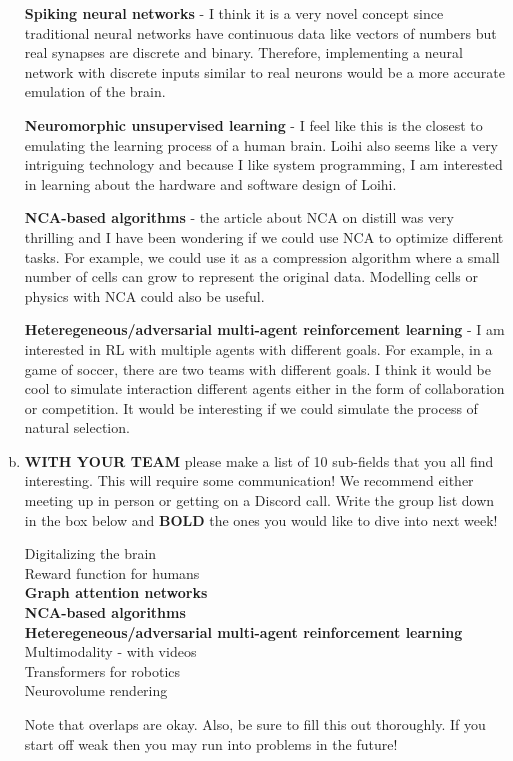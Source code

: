 \documentclass[letterpaper,11pt]{article}
\begin{document}
\begin{enumerate}[a)]
\textbf{Spiking neural networks} - I think it is a very novel concept since traditional neural networks have continuous
data like vectors of numbers but real synapses are discrete and binary. Therefore, implementing a neural network with
discrete inputs similar to real neurons would be a more accurate emulation of the brain.

\textbf{Neuromorphic unsupervised learning} - I feel like this is the closest to emulating the learning process
of a human brain. Loihi also seems like a very intriguing technology and because I like system programming, I am
interested in learning about the hardware and software design of Loihi.

\textbf{NCA-based algorithms} - the article about NCA on distill was very thrilling and I have been wondering if
we could use NCA to optimize different tasks. For example, we could use it as a compression algorithm where a small
number of cells can grow to represent the original data. Modelling cells or physics with NCA could also be useful.

\textbf{Heteregeneous/adversarial multi-agent reinforcement learning} - I am interested in RL with multiple agents
with different goals. For example, in a game of soccer, there are two teams with different goals. I think it would be
cool to simulate interaction different agents either in the form of collaboration or competition. It would be interesting
if we could simulate the process of natural selection.

\item \textbf{WITH YOUR TEAM} please make a list of 10 sub-fields that you all find interesting. This will require some communication! We recommend either meeting up in person or getting on a Discord call. Write the group list down in the box below and \textbf{BOLD} the ones you would like to dive into next week!

\begin{tcolorbox}
Digitalizing the brain\\
Reward function for humans\\
\textbf{Graph attention networks}\\
\textbf{NCA-based algorithms}\\
\textbf{Heteregeneous/adversarial multi-agent reinforcement learning}\\
Multimodality - with videos\\
Transformers for robotics\\
Neurovolume rendering
\end{tcolorbox}

Note that overlaps are okay. Also, be sure to fill this out thoroughly. If you start off weak then you may run into problems in the future!
    
\end{enumerate}
\end{document}
